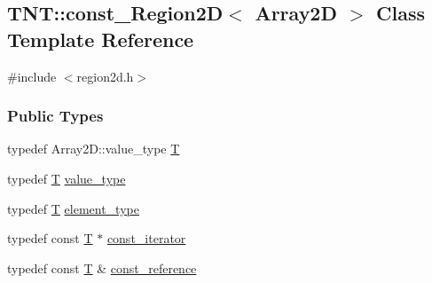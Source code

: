\subsection{TNT::const\_\-Region2D$<$ Array2D $>$ Class Template Reference}
\label{class_t_n_t_1_1const___region2_d}


{\ttfamily \#include $<$region2d.h$>$}

\subsubsection*{Public Types}
\begin{DoxyCompactItemize}
\item 
typedef Array2D::value\_\-type \hyperlink{class_t_n_t_1_1const___region2_d_a32134e56beb7ec872959e2446253aef6}{T}
\item 
typedef \hyperlink{class_t_n_t_1_1const___region2_d_a32134e56beb7ec872959e2446253aef6}{T} \hyperlink{class_t_n_t_1_1const___region2_d_a3dca61f41e46964dec836cd021cc9ba2}{value\_\-type}
\item 
typedef \hyperlink{class_t_n_t_1_1const___region2_d_a32134e56beb7ec872959e2446253aef6}{T} \hyperlink{class_t_n_t_1_1const___region2_d_ae63be5379f131ac76aa38c83d7527e9d}{element\_\-type}
\item 
typedef const \hyperlink{class_t_n_t_1_1const___region2_d_a32134e56beb7ec872959e2446253aef6}{T} $\ast$ \hyperlink{class_t_n_t_1_1const___region2_d_a29156d91491356a5e974b18beb6e1099}{const\_\-iterator}
\item 
typedef const \hyperlink{class_t_n_t_1_1const___region2_d_a32134e56beb7ec872959e2446253aef6}{T} \& \hyperlink{class_t_n_t_1_1const___region2_d_a67192ca52bf5e121ef168e537ad06d5d}{const\_\-reference}
\end{DoxyCompactItemize}
